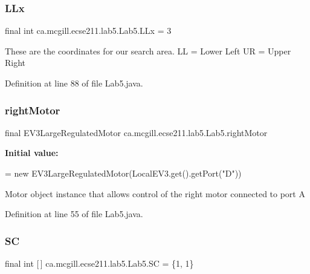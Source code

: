 \subsubsection{\texorpdfstring{L\+Lx}{LLx}}
{\footnotesize\ttfamily final int ca.\+mcgill.\+ecse211.\+lab5.\+Lab5.\+L\+Lx = 3\hspace{0.3cm}{\ttfamily [static]}}

These are the coordinates for our search area. LL = Lower Left UR = Upper Right 

Definition at line 88 of file Lab5.\+java.

\mbox{\label{classca_1_1mcgill_1_1ecse211_1_1lab5_1_1_lab5_a70575e1c6e84cd9d22cadd141ad6ceae}} 
\subsubsection{\texorpdfstring{right\+Motor}{rightMotor}}
{\footnotesize\ttfamily final E\+V3\+Large\+Regulated\+Motor ca.\+mcgill.\+ecse211.\+lab5.\+Lab5.\+right\+Motor\hspace{0.3cm}{\ttfamily [static]}}

{\bfseries Initial value\+:}
\begin{DoxyCode}
=
      \textcolor{keyword}{new} EV3LargeRegulatedMotor(LocalEV3.get().getPort(\textcolor{stringliteral}{"D"}))
\end{DoxyCode}
Motor object instance that allows control of the right motor connected to port A 

Definition at line 55 of file Lab5.\+java.

\mbox{\label{classca_1_1mcgill_1_1ecse211_1_1lab5_1_1_lab5_a39cbd32759fdb575b92b694f2713085d}} 
\subsubsection{\texorpdfstring{SC}{SC}}
{\footnotesize\ttfamily final int \mbox{[}$\,$\mbox{]} ca.\+mcgill.\+ecse211.\+lab5.\+Lab5.\+SC = \{1, 1\}\hspace{0.3cm}{\ttfamily [static]}}

